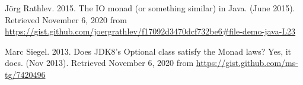 \begin{thebibliography}{}
Jörg Rathlev. 2015. The IO monad (or something similar) in Java. (June 2015). Retrieved November 6, 2020 from \url{https://gist.github.com/joergrathlev/f17092d3470dcf732be6#file-demo-java-L23}

Marc Siegel. 2013. Does JDK8's Optional class satisfy the Monad laws? Yes, it does. (Nov 2013). Retrieved November 6, 2020 from \url{https://gist.github.com/ms-tg/7420496}

\end{thebibliography}




